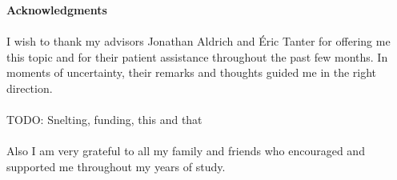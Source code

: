 
\vspace*{15\baselineskip}
\textbf{Acknowledgments}\\\\
I wish to thank my advisors Jonathan Aldrich and Éric Tanter for offering me this topic and for their patient assistance throughout the past few months. 
In moments of uncertainty, their remarks and thoughts guided me in the right direction.\\\\
TODO: Snelting, funding, this and that \\\\
Also I am very grateful to all my family and friends who encouraged and supported me throughout my years of study.